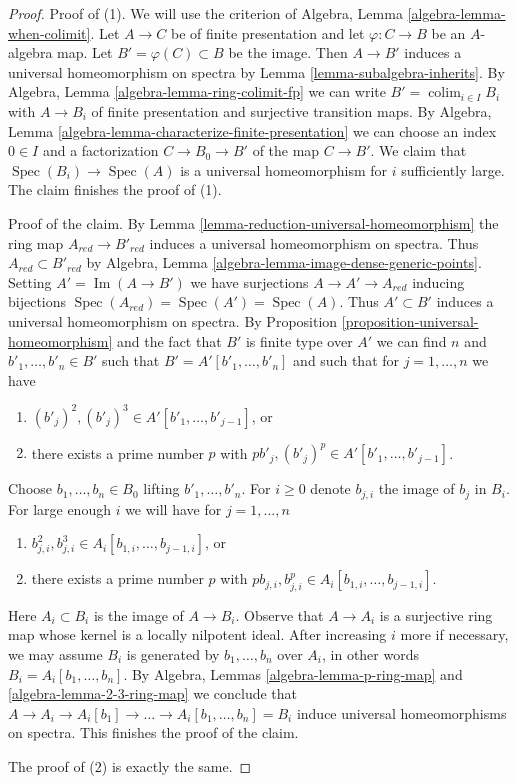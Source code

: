 \documentclass[10pt,a4paper]{amsart}
\theoremstyle{plain}
\theoremstyle{definition}
\theoremstyle{remark}
\numberwithin{equation}{subsection}
\def\colim{\mathop{\mathrm{colim}}\nolimits}
\def\Spec{\mathop{\mathrm{Spec}}}
\def\Im{\mathop{\mathrm{Im}}}
\begin{document}
\begin{proof}
Proof of (1). We will use the criterion of
Algebra, Lemma \ref{algebra-lemma-when-colimit}.
Let $A \to C$ be of finite presentation and let $\varphi : C \to B$
be an $A$-algebra map. Let $B' = \varphi(C) \subset B$ be the image.
Then $A \to B'$ induces a universal homeomorphism on spectra by
Lemma \ref{lemma-subalgebra-inherits}.
By Algebra, Lemma \ref{algebra-lemma-ring-colimit-fp}
we can write $B' = \colim_{i \in I} B_i$
with $A \to B_i$ of finite presentation and surjective
transition maps.
By Algebra, Lemma \ref{algebra-lemma-characterize-finite-presentation}
we can choose an index $0 \in I$
and a factorization $C \to B_0 \to B'$ of the map $C \to B'$.
We claim that $\Spec(B_i) \to \Spec(A)$ is a universal homeomorphism
for $i$ sufficiently large. The claim finishes the proof of (1).

\medskip\noindent
Proof of the claim. By Lemma \ref{lemma-reduction-universal-homeomorphism}
the ring map $A_{red} \to B'_{red}$ induces a universal homeomorphism
on spectra. Thus $A_{red} \subset B'_{red}$ by
Algebra, Lemma \ref{algebra-lemma-image-dense-generic-points}.
Setting $A' = \Im(A \to B')$ we have surjections $A \to A' \to A_{red}$
inducing bijections $\Spec(A_{red}) = \Spec(A') = \Spec(A)$.
Thus $A' \subset B'$ induces a universal homeomorphism on spectra.
By Proposition \ref{proposition-universal-homeomorphism}
and the fact that $B'$ is finite type over $A'$ we can
find $n$ and $b'_1, \ldots, b'_n \in B'$ such that
$B' = A'[b'_1, \ldots, b'_n]$
and such that for $j = 1, \ldots, n$ we have
\begin{enumerate}
\item $(b'_j)^2, (b'_j)^3 \in A'[b'_1, \ldots, b'_{j - 1}]$, or
\item there exists a prime number $p$ with
$pb'_j, (b'_j)^p \in A'[b'_1, \ldots, b'_{j - 1}]$.
\end{enumerate}
Choose $b_1, \ldots, b_n \in B_0$ lifting $b'_1, \ldots, b'_n$.
For $i \geq 0$ denote $b_{j, i}$ the image of $b_j$ in $B_i$.
For large enough $i$ we will have for $j = 1, \ldots, n$
\begin{enumerate}
\item $b_{j, i}^2, b_{j, i}^3 \in A_i[b_{1, i}, \ldots, b_{j - 1, i}]$, or
\item there exists a prime number $p$ with
$pb_{j, i}, b_{j, i}^p \in A_i[b_{1, i}, \ldots, b_{j - 1, i}]$.
\end{enumerate}
Here $A_i \subset B_i$ is the image of $A \to B_i$. Observe that $A \to A_i$
is a surjective ring map whose kernel is a locally nilpotent ideal.
After increasing $i$ more if necessary, we may assume $B_i$
is generated by $b_1, \ldots, b_n$ over $A_i$, in other words
$B_i = A_i[b_1, \ldots, b_n]$.
By Algebra, Lemmas \ref{algebra-lemma-p-ring-map} and
\ref{algebra-lemma-2-3-ring-map} we conclude that
$A \to A_i \to A_i[b_1] \to \ldots \to A_i[b_1, \ldots, b_n] = B_i$
induce universal homeomorphisms on spectra. This finishes the proof
of the claim.

\medskip\noindent
The proof of (2) is exactly the same.
\end{proof}
\end{document}
